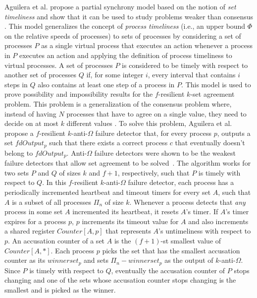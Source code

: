 Aguilera et al. propose a partial synchrony model based on the notion of \textit{set timeliness} and show that it can be used to study problems weaker than consensus \cite{Aguilera2012}. This model generalizes the concept of \textit{process timeliness} (i.e., an upper bound $\Phi$ on the relative speeds of processes) \cite{Dwork1988} to sets of processes by considering a set of processes $P$ as a single virtual process that executes an action whenever a process in $P$ executes an action and applying the definition of process timeliness to virtual processes. A set of processes $P$ is considered to be timely with respect to another set of processes $Q$ if, for some integer $i$, every interval that contains $i$ steps in $Q$ also contains at least one step of a process in $P$. This model is used to prove possibility and impossibility results for the $f$-resilient $k$-set agreement problem. This problem is a generalization of the consensus problem where, instead of having $N$ processes that have to agree on a single value, they need to decide on at most $k$ different values \cite{Chaudhuri1993}. To solve this problem, Aguilera et al. propose a $f$-resilient $k$-anti-$\Omega$ failure detector that, for every process $p$, outputs a set $fdOutput_p$ such that there exists a correct process $c$ that eventually doesn't belong to $fdOutput_p$. Anti-$\Omega$ failure detectors were shown to be the weakest failure detectors that allow set agreement to be solved~\cite{Zielinski2008}. The algorithm works for two sets $P$ and $Q$ of sizes $k$ and $f+1$, respectively, such that $P$ is timely with respect to $Q$. In this $f$-resilient $k$-anti-$\Omega$ failure detector, each process has a periodically incremented heartbeat and timeout timers for every set $A$, such that $A$ is a subset of all processes $\Pi_n$ of size $k$. Whenever a process detects that \textit{any} process in some set $A$ incremented its heartbeat, it resets $A$'s timer. If $A$'s timer expires for a process $p$, $p$ increments its timeout value for $A$ and also increments a shared register $Counter[A,p]$ that represents $A$'s untimeliness with respect to $p$. An accusation counter of a set $A$ is the $(f+1)$-st smallest value of $Counter[A,*]$. Each process $p$ picks the set that has the smallest accusation counter as its $winnerset_p$ and sets $\Pi_n - winnerset_p$ as the output of $k$-anti-$\Omega$. Since $P$ is timely with respect to $Q$, eventually the accusation counter of $P$ stops changing and one of the sets whose accusation counter stops changing is the smallest and is picked as the winner. \par

